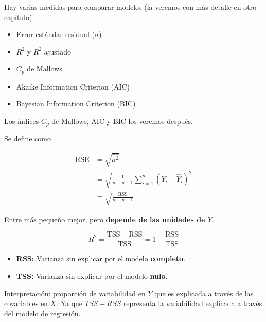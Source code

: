 \documentclass[
  12pt,
]{book}
\providecommand{\tightlist}{%
  \setlength{\itemsep}{0pt}\setlength{\parskip}{0pt}}
\begin{document}
Hay varias medidas para comparar modelos (la veremos con más detalle en
otro capítulo):

\begin{itemize}
\tightlist
\item
  Error estándar residual (\(\sigma\))
\item
  \(R^{2}\) y \(R^{2}\) ajustado
\item
  \(C_{p}\) de Mallows
\item
  Akaike Information Criterion (AIC)
\item
  Bayesian Information Criterion (BIC)
\end{itemize}

Los índices \(C_{p}\) de Mallows, AIC y BIC los veremos después.

\begin{description}
\tightlist
\item[Error estándar residual]
Se define como
\end{description}

\begin{align*}
\mathrm{RSE} 
&=  \sqrt{\hat{\sigma^{2}}}\\
&= \sqrt{\frac{1}{n-p-1} \sum_{i=1}^{n} \left( Y_{i} - \hat{Y}_{i}\right)^{2}} \\
&= \sqrt{\frac{\mathrm{RSS}}{n-p-1}}
\end{align*}

Entre más pequeño mejor, pero \textbf{depende de las unidades de \(Y\)}.

\begin{description}
\tightlist
\item[Estadístico \(R^{2}\)]
\begin{equation*}
R^{2} = \frac{\mathrm{TSS}-\mathrm{RSS}}{\mathrm{TSS}} = 1-\frac{\mathrm{RSS}}{\mathrm{TSS}}
\end{equation*}
\end{description}

\begin{itemize}
\tightlist
\item
  \textbf{RSS:} Varianza sin explicar por el modelo \textbf{completo}.
\item
  \textbf{TSS:} Varianza sin explicar por el modelo \textbf{nulo}.
\end{itemize}

Interpretación: proporción de variabilidad en \(Y\) que es explicada a
través de las covariables en \(X\). Ya que \(TSS-RSS\) representa la
variabilidad explicada a través del modelo de regresión.
\end{document}
